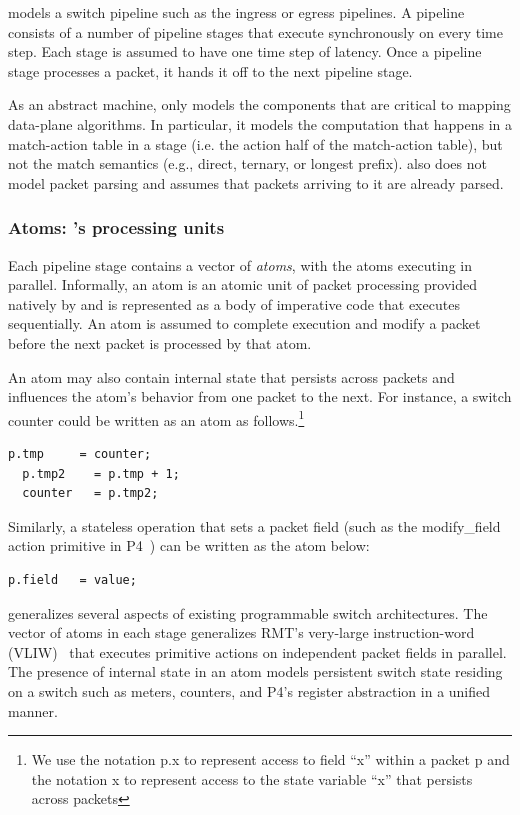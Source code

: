 \absmachine models a switch pipeline such as the ingress or egress pipelines. A
pipeline consists of a number of pipeline stages that execute synchronously on
every time step. Each stage is assumed to have one time step of latency. Once a
pipeline stage processes a packet, it hands it off to the next pipeline stage.

As an abstract machine, \absmachine only models the components that are
critical to mapping data-plane algorithms. In particular, it models the
computation that happens in a match-action table in a stage (i.e. the action
half of the match-action table), but not the match semantics (e.g., direct,
ternary, or longest prefix). \absmachine also does not model packet parsing and
assumes that packets arriving to it are already parsed.

\subsubsection{Atoms: \absmachine's processing units}

Each pipeline stage contains a vector of \textit{atoms}, with the atoms
executing in parallel. Informally, an atom is an atomic unit of packet
processing provided natively by \absmachine and is represented as a body of
imperative code that executes sequentially. An atom is assumed to complete
execution and modify a packet before the next packet is processed by that atom.

An atom may also contain internal state that persists across packets and
influences the atom's behavior from one packet to the next. For instance, a
switch counter could be written as an atom as follows.\footnote{We use the
  notation p.x to represent access to field ``x'' within a packet p and the
  notation x to represent access to the state variable ``x'' that persists across packets}
  \begin{lstlisting}[style=customc]
  p.tmp     = counter;
  p.tmp2    = p.tmp + 1;
  counter   = p.tmp2;
  \end{lstlisting}
Similarly, a stateless operation that sets a packet field (such as the
modify\_field action primitive in P4~\cite{p4spec}) can be written as the atom
below:
\begin{lstlisting}[style=customc]
p.field   = value;
\end{lstlisting}

\absmachine generalizes several aspects of existing programmable switch
architectures. The vector of atoms in each stage generalizes RMT's very-large
instruction-word (VLIW)~\cite{rmt} that executes primitive actions on
independent packet fields in parallel. The presence of internal state in an
atom models persistent switch state residing on a switch such as meters,
counters, and P4's register abstraction in a unified manner.

